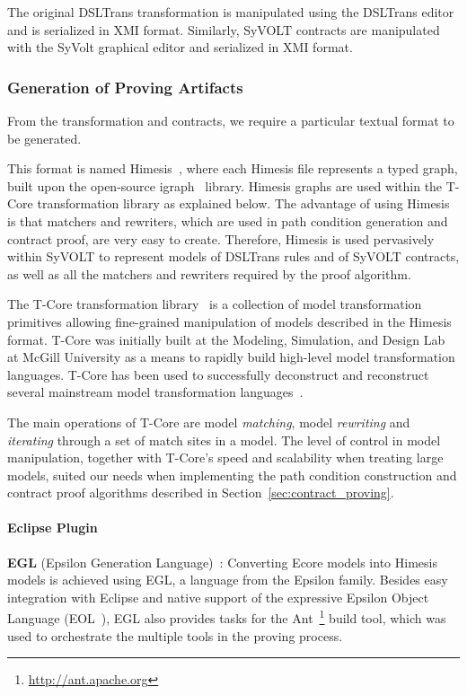   The original DSLTrans transformation is manipulated using the DSLTrans editor
  and is serialized in XMI format. Similarly, SyVOLT contracts are manipulated with the SyVolt graphical
  editor and serialized in XMI format.
  
  
\subsubsection{Generation of Proving Artifacts}

From the transformation and contracts, we require a particular textual format to be generated.

This format is named Himesis~\cite{Provost2006}, where each Himesis file represents a typed graph, built upon the open-source igraph~\cite{igraphTool} library. Himesis graphs are used within the T-Core transformation library as explained below. The advantage of using Himesis is that matchers and rewriters, which are used in path condition generation and contract proof, are very easy to create. Therefore, Himesis is used pervasively within SyVOLT to represent models of 
  DSLTrans rules and of SyVOLT contracts, as well as all the matchers and rewriters required by the proof algorithm.

The T-Core transformation library~\cite{Syriani2010a} is a collection of model transformation
  primitives allowing fine-grained manipulation of
  models described in the Himesis format. T-Core was initially built at the Modeling, Simulation, and Design Lab at McGill University as a means to rapidly build
  high-level model transformation languages. T-Core has been used to
  successfully deconstruct and reconstruct several mainstream model transformation
  languages~\cite{Syriani2010a}. 
  
  The main operations of T-Core are model \emph{matching},
  model \emph{rewriting} and \emph{iterating} through a set of match sites in a model.
  The level of control in model manipulation, together with T-Core's speed and
  scalability when treating large models, suited our needs when
  implementing the path condition construction and contract proof algorithms described in Section~\ref{sec:contract_proving}.


\paragraph{Eclipse Plugin}

\textbf{EGL} (Epsilon Generation Language)~\cite{eglTool}: Converting
  Ecore models into Himesis models is achieved using EGL, a language from the
  Epsilon family. Besides easy integration with Eclipse and native support of
  the expressive Epsilon Object Language (EOL~\cite{Kolovos}), EGL also provides tasks for the
Ant~\footnote{\url{http://ant.apache.org}} build tool, which was used to
orchestrate the multiple tools in the proving process.

